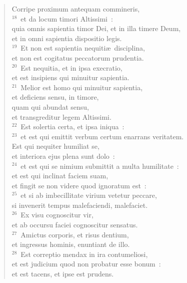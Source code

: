  \begin{verse}Corripe proximum antequam commineris,\\
${}^{18}$~et da locum timori Altissimi~:\\ quia omnis sapientia timor Dei, et in illa timere Deum,\\ et in omni sapientia dispositio legis.\\
${}^{19}$~Et non est sapientia nequiti\ae\ disciplina,\\ et non est cogitatus peccatorum prudentia.\\
${}^{20}$~Est nequitia, et in ipsa execratio,\\ et est insipiens qui minuitur sapientia.\\
${}^{21}$~Melior est homo qui minuitur sapientia,\\ et deficiens sensu, in timore,\\ quam qui abundat sensu,\\ et transgreditur legem Altissimi.\\
${}^{22}$~Est solertia certa, et ipsa iniqua~:\\
${}^{23}$~et est qui emittit verbum certum enarrans veritatem.\\ Est qui nequiter humiliat se,\\ et interiora ejus plena sunt dolo~:\\
${}^{24}$~et est qui se nimium submittit a multa humilitate~:\\ et est qui inclinat faciem suam,\\ et fingit se non videre quod ignoratum est~:\\
${}^{25}$~et si ab imbecillitate virium vetetur peccare,\\ si invenerit tempus malefaciendi, malefaciet.\\
${}^{26}$~Ex visu cognoscitur vir,\\ et ab occursu faciei cognoscitur sensatus.\\
${}^{27}$~Amictus corporis, et risus dentium,\\ et ingressus hominis, enuntiant de illo.\\
${}^{28}$~Est correptio mendax in ira contumeliosi,\\ et est judicium quod non probatur esse bonum~:\\ et est tacens, et ipse est prudens.\end{verse}


